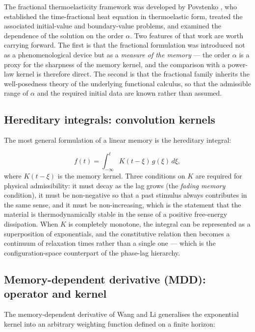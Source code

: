 The fractional thermoelasticity framework was developed by Povstenko \cite{Povstenko2004,Povstenko2009,Povstenko2016}, who established the time-fractional heat equation in thermoelastic form, treated the associated initial-value and boundary-value problems, and examined the dependence of the solution on the order $\alpha$. Two features of that work are worth carrying forward. The first is that the fractional formulation was introduced not as a phenomenological device but as a \emph{measure of the memory} --- the order $\alpha$ is a proxy for the sharpness of the memory kernel, and the comparison with a power-law kernel is therefore direct. The second is that the fractional family inherits the well-posedness theory of the underlying functional calculus, so that the admissible range of $\alpha$ and the required initial data are known rather than assumed.

\subsection{Hereditary integrals: convolution kernels}
\label{sec:6.3}

The most general formulation of a linear memory is the hereditary integral:

\begin{equation}
f(t) = \int_{-\infty}^{t} K(t-\xi)\,g(\xi)\,d\xi,
\label{eq:6.6}
\end{equation}
where $K(t-\xi)$ is the memory kernel. Three conditions on $K$ are required for physical admissibility: it must decay as the lag grows (the \emph{fading memory} condition), it must be non-negative so that a past stimulus always contributes in the same sense, and it must be non-increasing, which is the statement that the material is thermodynamically stable in the sense of a positive free-energy dissipation. When $K$ is completely monotone, the integral can be represented as a superposition of exponentials, and the constitutive relation then becomes a continuum of relaxation times rather than a single one --- which is the configuration-space counterpart of the phase-lag hierarchy.

\subsection{Memory-dependent derivative (MDD): operator and kernel}
\label{sec:6.4}

The memory-dependent derivative of Wang and Li \cite{Wang2011} generalises the exponential kernel into an arbitrary weighting function defined on a finite horizon:

